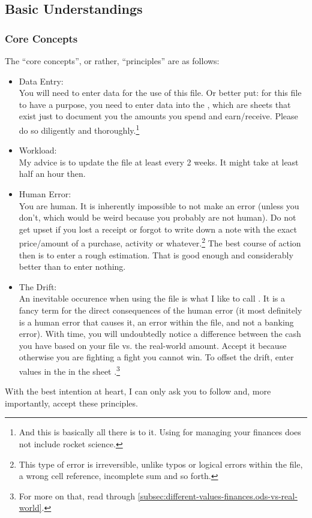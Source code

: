 \subsection{Basic Understandings}
\label{subsec:basic-understandings}

\subsubsection{Core Concepts}
\label{subsubsec:core-concepts}

The ``core concepts'', or rather, ``principles'' are as follows:
\begin{itemize}
	\item Data Entry:\\
	You will need to enter data for the use of this file.
	Or better put: for this file to have a purpose, you need to enter data into the , which are sheets that exist just to document you the amounts you spend and earn/receive.
	Please do so diligently and thoroughly.\footnote{And this is basically all there is to it.
	Using \tfn for managing your finances does not include rocket science.}
	\item Workload:\\
	My advice is to update the file at least every 2 weeks.
	It might take at least half an hour then.
	\item Human Error:\\
	You are human.
	It is inherently impossible to not make an error (unless you don't, which would be weird because you probably are not human).
	Do not get upset if you lost a receipt or forgot to write down a note with the exact price/amount of a purchase, activity or whatever.\footnote{This type of error is irreversible, unlike typos or logical errors within the file, \eg a wrong cell reference, incomplete sum and so forth.}
	The best course of action then is to enter a rough estimation.
	That is good enough and considerably better than to enter nothing.
	\item The Drift:\\
	An inevitable occurence when using the file is what I like to call .
	It is a fancy term for the direct consequences of the human error (it most definitely is a human error that causes it, \ie an error within the file, and not a banking error).
	With time, you will undoubtedly notice a difference between the cash you have based on your file vs. the real-world amount.
	Accept it because otherwise you are fighting a fight you cannot win.
	To offset the drift, enter values in the  in the sheet .\footnote{For more on that, read through \autoref{subsec:different-values-finances.ods-vs-real-world}.}
\end{itemize}
With the best intention at heart, I can only ask you to follow and, more importantly, accept these principles.

